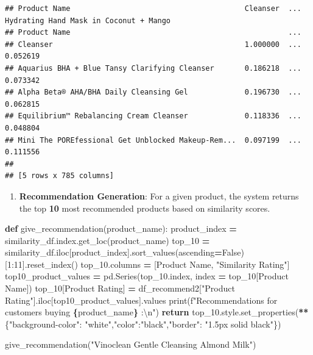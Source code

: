 \documentclass[
]{article}
\newenvironment{Shaded}{\begin{snugshade}}{\end{snugshade}}
\newcommand{\BuiltInTok}[1]{#1}
\newcommand{\CharTok}[1]{\textcolor[rgb]{0.31,0.60,0.02}{#1}}
\newcommand{\ControlFlowTok}[1]{\textcolor[rgb]{0.13,0.29,0.53}{\textbf{#1}}}
\newcommand{\DecValTok}[1]{\textcolor[rgb]{0.00,0.00,0.81}{#1}}
\newcommand{\KeywordTok}[1]{\textcolor[rgb]{0.13,0.29,0.53}{\textbf{#1}}}
\newcommand{\NormalTok}[1]{#1}
\newcommand{\OperatorTok}[1]{\textcolor[rgb]{0.81,0.36,0.00}{\textbf{#1}}}
\newcommand{\SpecialCharTok}[1]{\textcolor[rgb]{0.81,0.36,0.00}{\textbf{#1}}}
\newcommand{\SpecialStringTok}[1]{\textcolor[rgb]{0.31,0.60,0.02}{#1}}
\newcommand{\StringTok}[1]{\textcolor[rgb]{0.31,0.60,0.02}{#1}}
\newcommand{\VariableTok}[1]{\textcolor[rgb]{0.00,0.00,0.00}{#1}}
\providecommand{\tightlist}{%
  \setlength{\itemsep}{0pt}\setlength{\parskip}{0pt}}
\begin{document}
\begin{verbatim}
## Product Name                                        Cleanser  ...  Hydrating Hand Mask in Coconut + Mango
## Product Name                                                  ...                                        
## Cleanser                                            1.000000  ...                                0.052619
## Aquarius BHA + Blue Tansy Clarifying Cleanser       0.186218  ...                                0.073342
## Alpha Beta® AHA/BHA Daily Cleansing Gel             0.196730  ...                                0.062815
## Equilibrium™ Rebalancing Cream Cleanser             0.118336  ...                                0.048804
## Mini The POREfessional Get Unblocked Makeup-Rem...  0.097199  ...                                0.111556
## 
## [5 rows x 785 columns]
\end{verbatim}

\begin{enumerate}
\def\labelenumi{\arabic{enumi}.}
\setcounter{enumi}{2}
\tightlist
\item
  \textbf{Recommendation Generation}: For a given product, the system
  returns the top \textbf{10} most recommended products based on
  similarity scores.
\end{enumerate}

\begin{Shaded}
\begin{Highlighting}[]
\KeywordTok{def}\NormalTok{ give\_recommendation(product\_name):}
\NormalTok{    product\_index }\OperatorTok{=}\NormalTok{ similarity\_df.index.get\_loc(product\_name)}
\NormalTok{    top\_10 }\OperatorTok{=}\NormalTok{ similarity\_df.iloc[product\_index].sort\_values(ascending}\OperatorTok{=}\VariableTok{False}\NormalTok{)[}\DecValTok{1}\NormalTok{:}\DecValTok{11}\NormalTok{].reset\_index()}
\NormalTok{    top\_10.columns }\OperatorTok{=}\NormalTok{ [}\StringTok{\textquotesingle{}Product Name\textquotesingle{}}\NormalTok{, }\StringTok{"Similarity Rating"}\NormalTok{]}
\NormalTok{    top10\_product\_values }\OperatorTok{=}\NormalTok{ pd.Series(top\_10.index, index }\OperatorTok{=}\NormalTok{ top\_10[}\StringTok{\textquotesingle{}Product Name\textquotesingle{}}\NormalTok{])}
\NormalTok{    top\_10[}\StringTok{\textquotesingle{}Product Rating\textquotesingle{}}\NormalTok{] }\OperatorTok{=}\NormalTok{ df\_recommend2[}\StringTok{"Product Rating"}\NormalTok{].iloc[top10\_product\_values].values}
    \BuiltInTok{print}\NormalTok{(}\SpecialStringTok{f"Recommendations for customers buying }\SpecialCharTok{\{}\NormalTok{product\_name}\SpecialCharTok{\}}\SpecialStringTok{ :}\CharTok{\textbackslash{}n}\SpecialStringTok{"}\NormalTok{)}
    \ControlFlowTok{return}\NormalTok{ top\_10.style.set\_properties(}\OperatorTok{**}\NormalTok{\{}\StringTok{"background{-}color"}\NormalTok{: }\StringTok{"white"}\NormalTok{,}\StringTok{"color"}\NormalTok{:}\StringTok{"black"}\NormalTok{,}\StringTok{"border"}\NormalTok{: }\StringTok{"1.5px solid black"}\NormalTok{\})}
  
\NormalTok{give\_recommendation(}\StringTok{"Vinoclean Gentle Cleansing Almond Milk"}\NormalTok{)}
\end{Highlighting}
\end{Shaded}
\end{document}
